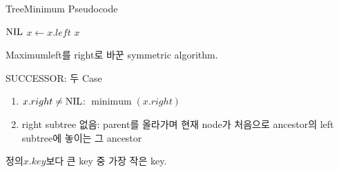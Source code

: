 \begin{frame}{TreeMinimum Pseudocode}
\small\begin{algorithmic}[1]
\State\Return $\mathrm{NIL}$\EndIf
{}\State $x\gets x.left$\EndWhile
\State\Return $x$
\EndProcedure
\end{algorithmic}
\begin{block}{Maximum}left를 right로 바꾼 symmetric algorithm.\end{block}
\end{frame}
\begin{frame}{SUCCESSOR: 두 Case}
\begin{enumerate}
\item $x.right\ne\mathrm{NIL}$: $\operatorname{minimum}(x.right)$
\item right subtree 없음: parent를 올라가며 현재 node가 처음으로 ancestor의 left subtree에 놓이는 그 ancestor
\end{enumerate}
\begin{block}{정의}$x.key$보다 큰 key 중 가장 작은 key.\end{block}
\end{frame}
